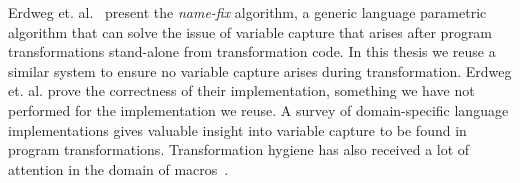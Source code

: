 Erdweg et. al.~\cite{Erdweg2014} present the \textit{name-fix} algorithm, a generic language parametric algorithm that can solve the issue of variable capture that arises after program transformations stand-alone from transformation code. In this thesis we reuse a similar system to ensure no variable capture arises during transformation. Erdweg et. al. prove the correctness of their implementation, something we have not performed for the implementation we reuse. A survey of domain-specific language implementations gives valuable insight into variable capture to be found in program transformations. Transformation hygiene has also received a lot of attention in the domain of macros~\cite{Kohlbecker1986,Herman2010a,Disney2014}. 
